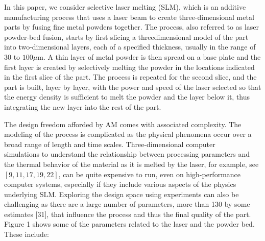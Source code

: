 \documentclass[10pt]{article}
\begin{document}
In this paper, we consider selective laser melting (SLM), which is an additive manufacturing process that uses a laser beam to create three-dimensional metal parts by fusing fine metal powders together. The process, also referred to as laser powder-bed fusion, starts by first slicing a threedimensional model of the part into two-dimensional layers, each of a specified thickness, usually in the range of 30 to $100 \mu \mathrm{m}$. A thin layer of metal powder is then spread on a base plate and the first layer is created by selectively melting the powder in the locations indicated in the first slice of the part. The process is repeated for the second slice, and the part is built, layer by layer, with the power and speed of the laser selected so that the energy density is sufficient to melt the powder and the layer below it, thus integrating the new layer into the rest of the part.

The design freedom afforded by AM comes with associated complexity. The modeling of the process is complicated as the physical phenomena occur over a broad range of length and time scales. Three-dimensional computer\\
simulations to understand the relationship between processing parameters and the thermal behavior of the material as it is melted by the laser, for example, see $[9,11,17,19,22]$, can be quite expensive to run, even on high-performance computer systems, especially if they include various aspects of the physics underlying SLM. Exploring the design space using experiments can also be challenging as there are a large number of parameters, more than 130 by some estimates [31], that influence the process and thus the final quality of the part. Figure 1 shows some of the parameters related to the laser and the powder bed. These include:
\end{document}
